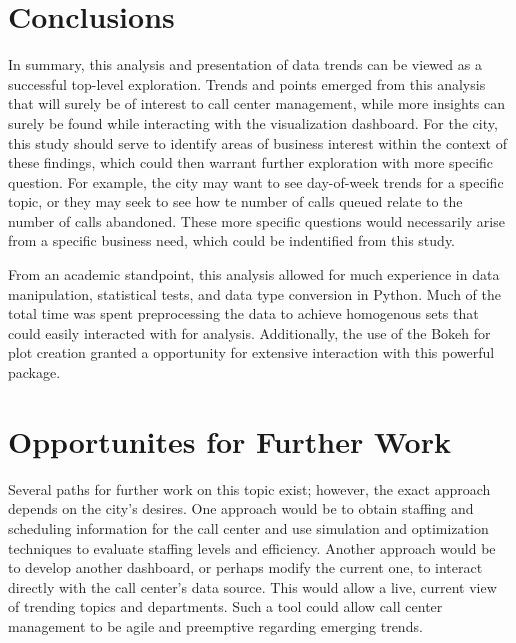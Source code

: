 \documentclass[11pt,twocolumn]{article}
\begin{document}
\section{Conclusions}

In summary, this analysis and presentation of data trends can be viewed as a successful top-level exploration.  Trends and points emerged from this analysis that will surely be of interest to call center management, while more insights can surely be found while interacting with the visualization dashboard.  For the city, this study should serve to identify areas of business interest within the context of these findings, which could then warrant further exploration with more specific question.  For example, the city may want to see day-of-week trends for a specific topic, or they may seek to see how te number of calls queued relate to the number of calls abandoned.  These more specific questions would necessarily arise from a specific business need, which could be indentified from this study.
\par
From an academic standpoint, this analysis allowed for much experience in data manipulation, statistical tests, and data type conversion in Python.  Much of the total time was spent preprocessing the data to achieve homogenous sets that could easily interacted with for analysis.  Additionally, the use of the Bokeh for plot creation granted a opportunity for extensive interaction with this powerful package.

\section{Opportunites for Further Work}

Several paths for further work on this topic exist; however, the exact approach depends on the city's desires.  One approach would be to obtain staffing and scheduling information for the call center and use simulation and optimization techniques to evaluate staffing levels and efficiency.  Another approach would be to develop another dashboard, or perhaps modify the current one, to interact directly with the call center's data source.  This would allow a live, current view of trending topics and departments.  Such a tool could allow call center management to be agile and preemptive regarding emerging trends.
\end{document}
